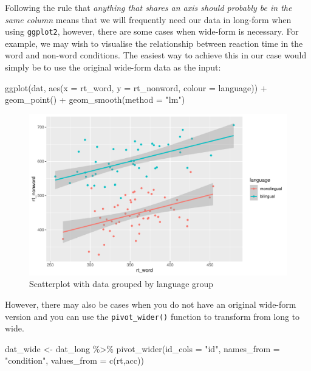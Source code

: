 \documentclass[
  english,
  doc,floatsintext]{apa6}
\newenvironment{Shaded}{\begin{snugshade}}{\end{snugshade}}
\newcommand{\AttributeTok}[1]{\textcolor[rgb]{0.77,0.63,0.00}{#1}}
\newcommand{\FunctionTok}[1]{\textcolor[rgb]{0.00,0.00,0.00}{#1}}
\newcommand{\NormalTok}[1]{#1}
\newcommand{\OtherTok}[1]{\textcolor[rgb]{0.56,0.35,0.01}{#1}}
\newcommand{\SpecialCharTok}[1]{\textcolor[rgb]{0.00,0.00,0.00}{#1}}
\newcommand{\StringTok}[1]{\textcolor[rgb]{0.31,0.60,0.02}{#1}}
\begin{document}
Following the rule that \emph{anything that shares an axis should probably be in the same column} means that we will frequently need our data in long-form when using \texttt{ggplot2}, however, there are some cases when wide-form is necessary. For example, we may wish to visualise the relationship between reaction time in the word and non-word conditions. The easiest way to achieve this in our case would simply be to use the original wide-form data as the input:

\begin{Shaded}
\begin{Highlighting}[]
\FunctionTok{ggplot}\NormalTok{(dat, }\FunctionTok{aes}\NormalTok{(}\AttributeTok{x =}\NormalTok{ rt\_word, }\AttributeTok{y =}\NormalTok{ rt\_nonword, }\AttributeTok{colour =}\NormalTok{ language)) }\SpecialCharTok{+}
  \FunctionTok{geom\_point}\NormalTok{() }\SpecialCharTok{+}
  \FunctionTok{geom\_smooth}\NormalTok{(}\AttributeTok{method =} \StringTok{"lm"}\NormalTok{)}
\end{Highlighting}
\end{Shaded}

\begin{figure}

{\centering \includegraphics[width=1\linewidth]{images/unnamed-chunk-14-1} 

}

\caption{Scatterplot with data grouped by language group}\label{fig:unnamed-chunk-14}
\end{figure}

However, there may also be cases when you do not have an original wide-form version and you can use the \texttt{pivot\_wider()} function to transform from long to wide.

\begin{Shaded}
\begin{Highlighting}[]
\NormalTok{dat\_wide }\OtherTok{\textless{}{-}}\NormalTok{ dat\_long }\SpecialCharTok{\%\textgreater{}\%}
  \FunctionTok{pivot\_wider}\NormalTok{(}\AttributeTok{id\_cols =} \StringTok{"id"}\NormalTok{,}
              \AttributeTok{names\_from =} \StringTok{"condition"}\NormalTok{, }
              \AttributeTok{values\_from =} \FunctionTok{c}\NormalTok{(rt,acc))}
\end{Highlighting}
\end{Shaded}
\end{document}
